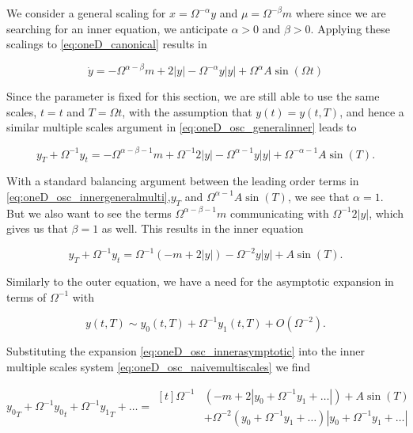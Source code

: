 We consider a general scaling for $x=\Omega^{-\alpha}y$ and $\mu = \Omega^{-\beta}m$ where since we are searching for an inner equation, we anticipate $\alpha>0$ and $\beta>0$. Applying these scalings to \eqref{eq:oneD_canonical} results in

\begin{equation}\label{eq:oneD_osc_generalinner}
\dot{y} = -\Omega^{\alpha-\beta}m+2|y|-\Omega^{-\alpha}y|y|+\Omega^{\alpha}A\sin(\Omega t)
\end{equation}

Since the parameter is fixed for this section, we are still able to use the same scales, $t=t$ and $T=\Omega t$, with the assumption that $y(t)=y(t,T)$, and hence a similar multiple scales argument in \eqref{eq:oneD_osc_generalinner} leads to

\begin{equation}\label{eq:oneD_osc_innergeneralmulti}
y_T+\Omega^{-1}y_t = - \Omega^{\alpha-\beta-1}m+\Omega^{-1}2|y|-\Omega^{\alpha-1}y|y|+\Omega^{-\alpha-1}A\sin(T).
\end{equation}

With a standard balancing argument between the leading order terms in \eqref{eq:oneD_osc_innergeneralmulti},$y_T$ and $\Omega^{\alpha-1} A\sin(T)$, we see that $\alpha=1$. But we also want to see the terms $\Omega^{\alpha-\beta-1}m$ communicating with $\Omega^{-1}2|y|$, which gives us that $\beta=1$ as well. This results in the inner equation

\begin{equation}\label{eq:oneD_osc_naivemultiscales}
y_T+\Omega^{-1}y_t = \Omega^{-1}\left(-m+2|y|\right)-\Omega^{-2}y|y|+A\sin(T).
\end{equation}

Similarly to the outer equation, we have a need for the asymptotic expansion in terms of $\Omega^{-1}$ with

\begin{equation}\label{eq:oneD_osc_innerasymptotic}
y(t,T)\sim y_0(t,T)+\Omega^{-1}y_1(t,T)+O(\Omega^{-2}).
\end{equation}

Substituting the expansion \eqref{eq:oneD_osc_innerasymptotic} into the inner multiple scales system \eqref{eq:oneD_osc_naivemultiscales} we find

\begin{equation*}
{y_0}_T+\Omega^{-1}{y_0}_t+\Omega^{-1}{y_1}_T+\ldots =\begin{aligned}[t]\Omega^{-1}&(-m+2|y_0+\Omega^{-1}y_1+\ldots|)+A\sin(T)\\
&+\Omega^{-2}(y_0+\Omega^{-1}y_1+\ldots)|y_0+\Omega^{-1}y_1+\ldots|
\end{aligned}
\end{equation*}

